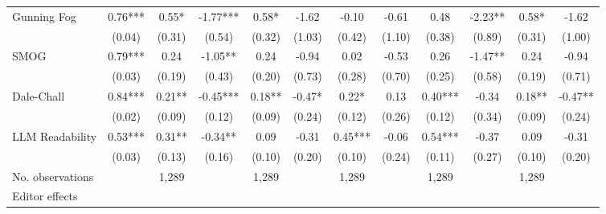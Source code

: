 \begin{table}
\begin{threeparttable}
\begin{tabular}{p{3cm}S@{}S@{}S@{}S@{}S@{}S@{}S@{}S@{}S@{}S@{}S@{}}
            Gunning Fog                   &        0.76***&        0.55*  &       -1.77***&        0.58*  &       -1.62   &       -0.10   &       -0.61   &        0.48   &       -2.23** &        0.58*  &       -1.62   \\
                                          &      (0.04)   &      (0.31)   &      (0.54)   &      (0.32)   &      (1.03)   &      (0.42)   &      (1.10)   &      (0.38)   &      (0.89)   &      (0.31)   &      (1.00)   \\
            SMOG                          &        0.79***&        0.24   &       -1.05** &        0.24   &       -0.94   &        0.02   &       -0.53   &        0.26   &       -1.47** &        0.24   &       -0.94   \\
                                          &      (0.03)   &      (0.19)   &      (0.43)   &      (0.20)   &      (0.73)   &      (0.28)   &      (0.70)   &      (0.25)   &      (0.58)   &      (0.19)   &      (0.71)   \\
            Dale-Chall                    &        0.84***&        0.21** &       -0.45***&        0.18** &       -0.47*  &        0.22*  &        0.13   &        0.40***&       -0.34   &        0.18** &       -0.47** \\
                                          &      (0.02)   &      (0.09)   &      (0.12)   &      (0.09)   &      (0.24)   &      (0.12)   &      (0.26)   &      (0.12)   &      (0.34)   &      (0.09)   &      (0.24)   \\
            LLM Readability        &        0.53***&        0.31** &       -0.34** &        0.09   &       -0.31   &        0.45***&       -0.06   &        0.54***&       -0.37   &        0.09   &       -0.31   \\
                                          &      (0.03)   &      (0.13)   &      (0.16)   &      (0.10)   &      (0.20)   &      (0.10)   &      (0.24)   &      (0.11)   &      (0.27)   &      (0.10)   &      (0.20)   \\
            \midrule
            No. observations              &               &       1,289   &               &       1,289   &               &       1,289   &               &       1,289   &               &       1,289   &               \\
            \midrule
            Editor effects        &               &           {}   &               &           {}   &               &           {}   &               &           {}   &               &               &               \\

\end{tabular}
\end{threeparttable}
\end{table}
